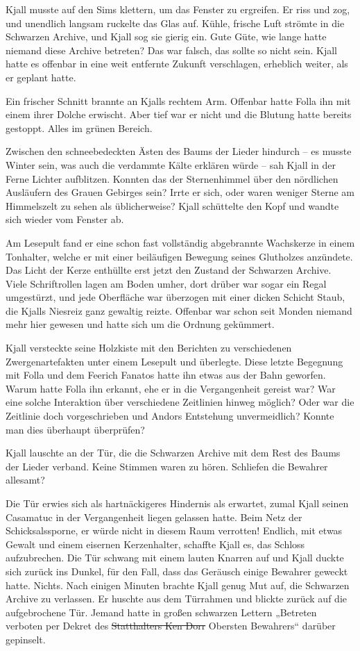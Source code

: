 \documentclass[10pt, a4paper, oneside]{book}
\begin{document}
Kjall musste auf den Sims klettern, um das Fenster zu ergreifen. Er riss und zog, und unendlich langsam ruckelte das Glas auf. Kühle, frische Luft strömte in die Schwarzen Archive, und Kjall sog sie gierig ein. Gute Güte, wie lange hatte niemand diese Archive betreten? Das war falsch, das sollte so nicht sein. Kjall hatte es offenbar in eine weit entfernte Zukunft verschlagen, erheblich weiter, als er geplant hatte.

Ein frischer Schnitt brannte an Kjalls rechtem Arm. Offenbar hatte Folla ihn mit einem ihrer Dolche erwischt. Aber tief war er nicht und die Blutung hatte bereits gestoppt. Alles im grünen Bereich.

Zwischen den schneebedeckten Ästen des Baums der Lieder hindurch – es musste Winter sein, was auch die verdammte Kälte erklären würde – sah Kjall in der Ferne Lichter aufblitzen. Konnten das der Sternenhimmel über den nördlichen Ausläufern des Grauen Gebirges sein? Irrte er sich, oder waren weniger Sterne am Himmelszelt zu sehen als üblicherweise? Kjall schüttelte den Kopf und wandte sich wieder vom Fenster ab.

Am Lesepult fand er eine schon fast vollständig abgebrannte Wachskerze in einem Tonhalter, welche er mit einer beiläufigen Bewegung seines Glutholzes anzündete. Das Licht der Kerze enthüllte erst jetzt den Zustand der Schwarzen Archive. Viele Schriftrollen lagen am Boden umher, dort drüber war sogar ein Regal umgestürzt, und jede Oberfläche war überzogen mit einer dicken Schicht Staub, die Kjalls Niesreiz ganz gewaltig reizte. Offenbar war schon seit Monden niemand mehr hier gewesen und hatte sich um die Ordnung gekümmert.

Kjall versteckte seine Holzkiste mit den Berichten zu verschiedenen Zwergenartefakten unter einem Lesepult und überlegte. Diese letzte Begegnung mit Folla und dem Feerich Fanatos hatte ihn etwas aus der Bahn geworfen. Warum hatte Folla ihn erkannt, ehe er in die Vergangenheit gereist war? War eine solche Interaktion über verschiedene Zeitlinien hinweg möglich? Oder war die Zeitlinie doch vorgeschrieben und Andors Entstehung unvermeidlich? Konnte man dies überhaupt überprüfen?

Kjall lauschte an der Tür, die die Schwarzen Archive mit dem Rest des Baums der Lieder verband. Keine Stimmen waren zu hören. Schliefen die Bewahrer allesamt?

Die Tür erwies sich als hartnäckigeres Hindernis als erwartet, zumal Kjall seinen Casamatuc in der Vergangenheit liegen gelassen hatte. Beim Netz der Schicksalssporne, er würde nicht in diesem Raum verrotten! Endlich, mit etwas Gewalt und einem eisernen Kerzenhalter, schaffte Kjall es, das Schloss aufzubrechen. Die Tür schwang mit einem lauten Knarren auf und Kjall duckte sich zurück ins Dunkel, für den Fall, dass das Geräusch einige Bewahrer geweckt hatte. Nichts. Nach einigen Minuten brachte Kjall genug Mut auf, die Schwarzen Archive zu verlassen. Er huschte aus dem Türrahmen und blickte zurück auf die aufgebrochene Tür. Jemand hatte in großen schwarzen Lettern „Betreten verboten per Dekret des \st{Statthalters Ken Dorr} Obersten Bewahrers“ darüber gepinselt.
\end{document}
